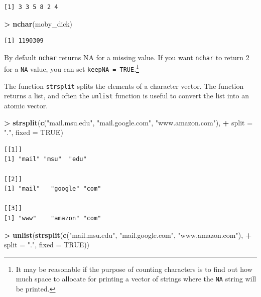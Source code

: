 \documentclass[
]{krantz}
\makeatletter
\newenvironment{Shaded}{\begin{snugshade}}{\end{snugshade}}
\newcommand{\DataTypeTok}[1]{\textcolor[rgb]{0.27,0.27,0.27}{#1}}
\newcommand{\KeywordTok}[1]{\textcolor[rgb]{0.27,0.27,0.27}{\textbf{#1}}}
\newcommand{\NormalTok}[1]{#1}
\newcommand{\OperatorTok}[1]{\textcolor[rgb]{0.43,0.43,0.43}{\textbf{#1}}}
\newcommand{\OtherTok}[1]{\textcolor[rgb]{0.37,0.37,0.37}{#1}}
\newcommand{\StringTok}[1]{\textcolor[rgb]{0.5,0.5,0.5}{#1}}
\newenvironment{kframe}{%
\medskip{}
\setlength{\fboxsep}{.8em}
 \def\at@end@of@kframe{}%
 \ifinner\ifhmode%
  \def\at@end@of@kframe{\end{minipage}}%
  \begin{minipage}{\columnwidth}%
 \fi\fi%
 \def\FrameCommand##1{\hskip\@totalleftmargin \hskip-\fboxsep
 \colorbox{shadecolor}{##1}\hskip-\fboxsep
     \hskip-\linewidth \hskip-\@totalleftmargin \hskip\columnwidth}%
 \MakeFramed {\advance\hsize-\width
   \@totalleftmargin\z@ \linewidth\hsize
   \@setminipage}}%
 {\par\unskip\endMakeFramed%
 \at@end@of@kframe}
\renewenvironment{Shaded}{\begin{kframe}}{\end{kframe}}
\makeatother
\begin{document}
\begin{verbatim}
[1] 3 3 5 8 2 4
\end{verbatim}

\begin{Shaded}
\begin{Highlighting}[]
\OperatorTok{\textgreater{}}\StringTok{ }\KeywordTok{nchar}\NormalTok{(moby\_dick)}
\end{Highlighting}
\end{Shaded}

\begin{verbatim}
[1] 1190309
\end{verbatim}

By default \texttt{nchar} returns NA for a missing value. If you want \texttt{nchar} to return 2 for a \texttt{NA} value, you can set \texttt{keepNA\ =\ TRUE}.\footnote{It may be reasonable if the purpose of counting characters is to find out how much space to allocate for printing a vector of strings where the \texttt{NA} string will be printed.}

The function \texttt{strsplit} splits the elements of a character vector. The function returns a list, and often the \texttt{unlist} function is useful to convert the list into an atomic vector.

\begin{Shaded}
\begin{Highlighting}[]
\OperatorTok{\textgreater{}}\StringTok{ }\KeywordTok{strsplit}\NormalTok{(}\KeywordTok{c}\NormalTok{(}\StringTok{"mail.msu.edu"}\NormalTok{, }\StringTok{"mail.google.com"}\NormalTok{, }\StringTok{"www.amazon.com"}\NormalTok{),}
\OperatorTok{+}\StringTok{          }\DataTypeTok{split =} \StringTok{"."}\NormalTok{, }\DataTypeTok{fixed =} \OtherTok{TRUE}\NormalTok{)}
\end{Highlighting}
\end{Shaded}

\begin{verbatim}
[[1]]
[1] "mail" "msu"  "edu" 

[[2]]
[1] "mail"   "google" "com"   

[[3]]
[1] "www"    "amazon" "com"   
\end{verbatim}

\begin{Shaded}
\begin{Highlighting}[]
\OperatorTok{\textgreater{}}\StringTok{ }\KeywordTok{unlist}\NormalTok{(}\KeywordTok{strsplit}\NormalTok{(}\KeywordTok{c}\NormalTok{(}\StringTok{"mail.msu.edu"}\NormalTok{, }\StringTok{"mail.google.com"}\NormalTok{, }\StringTok{"www.amazon.com"}\NormalTok{),}
\OperatorTok{+}\StringTok{                 }\DataTypeTok{split =} \StringTok{"."}\NormalTok{, }\DataTypeTok{fixed =} \OtherTok{TRUE}\NormalTok{))}
\end{Highlighting}
\end{Shaded}
\end{document}
